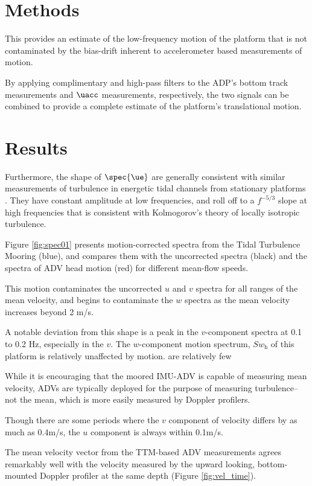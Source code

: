 \section{Methods}


This provides an estimate of the low-frequency motion of the platform that is not contaminated by the bias-drift inherent to accelerometer based measurements of motion. 

By applying complimentary and high-pass filters to the ADP's bottom track measurements and $\uacc$ measurements, respectively, the two signals can be combined to provide a complete estimate of the platform's translational motion.


\section{Results}

Furthermore, the shape of $\spec{\ue}$ are generally consistent with similar measurements of turbulence in energetic tidal channels from stationary platforms \citep[]{Thomson++2010} . They have constant amplitude at low frequencies, and roll off to a $f^{-5/3}$ slope at high frequencies that is consistent with Kolmogorov's theory of locally isotropic turbulence. 

Figure \ref{fig:spec01} presents motion-corrected spectra from the Tidal Turbulence Mooring (blue), and compares them with the uncorrected spectra (black) and the spectra of ADV head motion (red) for different mean-flow speeds.  

This motion contaminates the uncorrected $u$ and $v$ spectra for all ranges of the mean velocity, and begins to contaminate the $w$ spectra as the mean velocity increases beyond 2 m/s. 

A notable deviation from this shape is a peak in the $v$-component spectra at 0.1 to 0.2 Hz, especially in the $v$. The $w$-component motion spectrum, $S{w_\mathrm{h}}$ of this platform is relatively unaffected by motion. are relatively few 

While it is encouraging that the moored IMU-ADV is capable of measuring mean velocity, ADVs are typically deployed for the purpose of measuring turbulence--not the mean, which is more easily measured by Doppler profilers. 

Though there are some periods where the $v$ component of velocity differs by as much as 0.4m/s, the $u$ component is always within 0.1m/s.

The mean velocity vector from the TTM-based ADV measurements agrees remarkably well with the velocity measured by the upward looking, bottom-mounted Doppler profiler at the same depth (Figure \ref{fig:vel_time}). 

